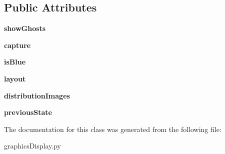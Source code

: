 \subsection*{Public Attributes}
\begin{DoxyCompactItemize}
\item 
\mbox{\label{classgraphics_display_1_1_first_person_pacman_graphics_aae1ccb9db807d50f65415a19a48485a9}} 
{\bfseries show\+Ghosts}
\item 
\mbox{\label{classgraphics_display_1_1_first_person_pacman_graphics_af14d89fcadf1b96c2b288b03c173cd49}} 
{\bfseries capture}
\item 
\mbox{\label{classgraphics_display_1_1_first_person_pacman_graphics_ae032aba81cef88b005ad440771120fb8}} 
{\bfseries is\+Blue}
\item 
\mbox{\label{classgraphics_display_1_1_first_person_pacman_graphics_a3b7983e2c15de390851a03c501099131}} 
{\bfseries layout}
\item 
\mbox{\label{classgraphics_display_1_1_first_person_pacman_graphics_a39c1689911d46d847ceef6c4aa1b4500}} 
{\bfseries distribution\+Images}
\item 
\mbox{\label{classgraphics_display_1_1_first_person_pacman_graphics_a6a9abfa36d0d270894d33a1e17b1e148}} 
{\bfseries previous\+State}
\end{DoxyCompactItemize}


The documentation for this class was generated from the following file\+:\begin{DoxyCompactItemize}
\item 
graphics\+Display.\+py\end{DoxyCompactItemize}
